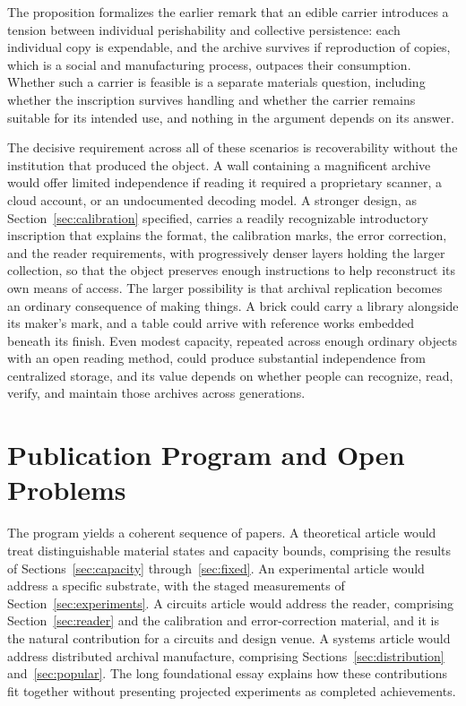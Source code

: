 The proposition formalizes the earlier remark that an edible carrier introduces a tension between individual perishability and collective persistence: each individual copy is expendable, and the archive survives if reproduction of copies, which is a social and manufacturing process, outpaces their consumption. Whether such a carrier is feasible is a separate materials question, including whether the inscription survives handling and whether the carrier remains suitable for its intended use, and nothing in the argument depends on its answer.

The decisive requirement across all of these scenarios is recoverability without the institution that produced the object. A wall containing a magnificent archive would offer limited independence if reading it required a proprietary scanner, a cloud account, or an undocumented decoding model. A stronger design, as Section~\ref{sec:calibration} specified, carries a readily recognizable introductory inscription that explains the format, the calibration marks, the error correction, and the reader requirements, with progressively denser layers holding the larger collection, so that the object preserves enough instructions to help reconstruct its own means of access. The larger possibility is that archival replication becomes an ordinary consequence of making things. A brick could carry a library alongside its maker's mark, and a table could arrive with reference works embedded beneath its finish. Even modest capacity, repeated across enough ordinary objects with an open reading method, could produce substantial independence from centralized storage, and its value depends on whether people can recognize, read, verify, and maintain those archives across generations.

\section{Publication Program and Open Problems}\label{sec:program}

The program yields a coherent sequence of papers. A theoretical article would treat distinguishable material states and capacity bounds, comprising the results of Sections~\ref{sec:capacity} through~\ref{sec:fixed}. An experimental article would address a specific substrate, with the staged measurements of Section~\ref{sec:experiments}. A circuits article would address the reader, comprising Section~\ref{sec:reader} and the calibration and error-correction material, and it is the natural contribution for a circuits and design venue. A systems article would address distributed archival manufacture, comprising Sections~\ref{sec:distribution} and~\ref{sec:popular}. The long foundational essay explains how these contributions fit together without presenting projected experiments as completed achievements.


